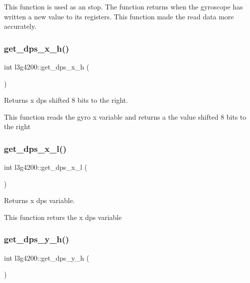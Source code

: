 This function is used as an stop. The function returns when the gyroscope has written a new value to it\textquotesingle{}s registers. This function made the read data more accurately. \mbox{\label{classl3g4200_a5182e240887b44c1178576092a61f5fd}} 
\subsubsection{\texorpdfstring{get\+\_\+dps\+\_\+x\+\_\+h()}{get\_dps\_x\_h()}}
{\footnotesize\ttfamily int l3g4200\+::get\+\_\+dps\+\_\+x\+\_\+h (\begin{DoxyParamCaption}{ }\end{DoxyParamCaption})\hspace{0.3cm}{\ttfamily [inline]}}



Returns x dps shifted 8 bits to the right. 

This function reads the gyro x variable and returns a the value shifted 8 bits to the right \mbox{\label{classl3g4200_a0c96f1bc6aabb4a5bb4652d3ae703821}} 
\subsubsection{\texorpdfstring{get\+\_\+dps\+\_\+x\+\_\+l()}{get\_dps\_x\_l()}}
{\footnotesize\ttfamily int l3g4200\+::get\+\_\+dps\+\_\+x\+\_\+l (\begin{DoxyParamCaption}{ }\end{DoxyParamCaption})\hspace{0.3cm}{\ttfamily [inline]}}



Returns x dps variable. 

This function returs the x dps variable \mbox{\label{classl3g4200_a46b55512661be401f9a6b7cb7c87b4a1}} 
\subsubsection{\texorpdfstring{get\+\_\+dps\+\_\+y\+\_\+h()}{get\_dps\_y\_h()}}
{\footnotesize\ttfamily int l3g4200\+::get\+\_\+dps\+\_\+y\+\_\+h (\begin{DoxyParamCaption}{ }\end{DoxyParamCaption})\hspace{0.3cm}{\ttfamily [inline]}}



